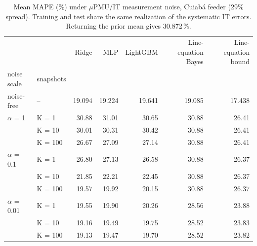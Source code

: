 \begin{table}[htbp]
\centering
\small
\caption{Mean MAPE (\%) under $\mu$PMU/IT measurement noise, Cuiabá feeder (29\% spread). Training and test share the same realization of the systematic IT errors. Returning the prior mean gives 30.872\,\%.}
\label{tab:e3_cuiaba29}
\begin{tabular}{llrrrrr}
\toprule
 &  & Ridge & MLP & LightGBM & Line-equation Bayes & Line-equation bound \\
noise scale & snapshots &  &  &  &  &  \\
\midrule
noise-free & -- & 19.094 & 19.224 & 19.641 & 19.085 & 17.438 \\
\midrule
$\alpha$ = 1 & K = 1 & 30.88 & 31.01 & 30.65 & 30.88 & 26.41 \\
 & K = 10 & 30.01 & 30.31 & 30.42 & 30.88 & 26.41 \\
 & K = 100 & 26.67 & 27.09 & 27.14 & 30.88 & 26.41 \\
\midrule
$\alpha$ = 0.1 & K = 1 & 26.80 & 27.13 & 26.58 & 30.88 & 26.37 \\
 & K = 10 & 21.85 & 22.21 & 22.45 & 30.88 & 26.37 \\
 & K = 100 & 19.57 & 19.92 & 20.15 & 30.88 & 26.37 \\
\midrule
$\alpha$ = 0.01 & K = 1 & 19.55 & 19.90 & 20.26 & 28.56 & 23.88 \\
 & K = 10 & 19.16 & 19.49 & 19.75 & 28.52 & 23.83 \\
 & K = 100 & 19.13 & 19.47 & 19.70 & 28.52 & 23.82 \\
\bottomrule
\end{tabular}
\end{table}
